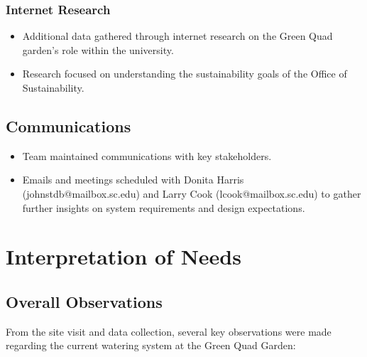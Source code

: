 \documentclass[12pt]{report}
\begin{document}
\subsubsection{Internet Research}
\begin{itemize}
    \item Additional data gathered through internet research on the Green Quad garden’s role within the university.
    \item Research focused on understanding the sustainability goals of the Office of Sustainability.
\end{itemize}

\subsection{Communications}
\begin{itemize}
    \item Team maintained communications with key stakeholders.
    \item Emails and meetings scheduled with Donita Harris (johnstdb@mailbox.sc.edu) and Larry Cook (lcook@mailbox.sc.edu) to gather further insights on system requirements and design expectations.
\end{itemize}




\section{Interpretation of Needs}

\subsection{Overall Observations}

From the site visit and data collection, several key observations were made regarding the current watering system at the Green Quad Garden:
\end{document}
